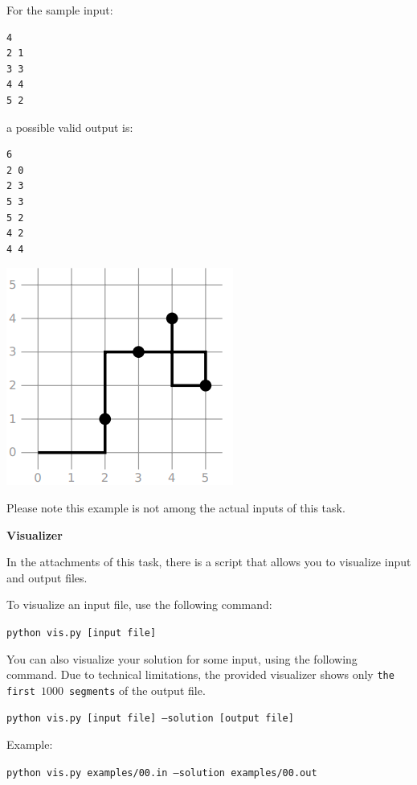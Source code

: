 For the sample input:
\begin{verbatim}
4
2 1
3 3
4 4
5 2
\end{verbatim}

a possible valid output is:

\begin{verbatim}
6
2 0
2 3
5 3
5 2
4 2
4 4
\end{verbatim}

\begin{center}
\includegraphics[scale=0.5]{1.png}
\end{center}

Please note this example is not among the actual inputs of this task.


\textbf{Visualizer}

In the attachments of this task, there is a script that allows you to visualize input and output files.

To visualize an input file, use the following command:

\texttt{python vis.py [input file]}

You can also visualize your solution for some input, using the following command.
Due to technical limitations, the provided visualizer shows only \texttt{the first $1000$ segments} of the output file.

\texttt{python vis.py [input file] --solution [output file]}

Example:

\texttt{python vis.py examples/00.in --solution examples/00.out}
